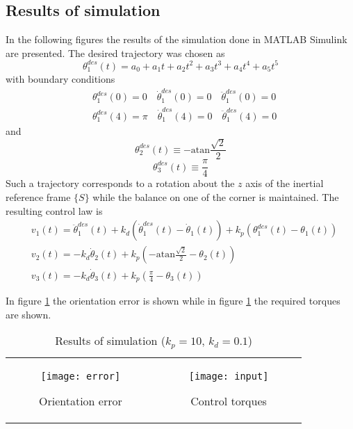\subsection{Results of simulation}
In the following figures the results of the simulation done
in MATLAB Simulink are presented.
The desired trajectory was chosen as
\[
\theta_1^{des}(t) = a_0 + a_1 t + a_2 t^2 + a_3 t^3 + a_4 t^4 + a_5 t^5
\]
with boundary conditions
\[
\begin{split}
  &\theta_1^{des}(0) = 0 \quad \dot{\theta}_1^{des}(0)= 0 \quad \ddot{\theta}_1^{des}(0) = 0\\
    &\theta_1^{des}(4) = \pi \quad \dot{\theta}_1^{des}(4)= 0 \quad \ddot{\theta}_1^{des}(4) = 0
\end{split}
\]
and
\[
\theta_2^{des}(t) \equiv -\mathrm{atan}\frac{\sqrt{2}}{2}
\]
\[
\theta_3^{des}(t) \equiv \frac{\pi}{4}
\]
Such a trajectory corresponds to a rotation about the $z$ axis of the inertial
reference frame $\{S\}$ while the balance on one of the corner is maintained.
The resulting control law is
\begin{equation}\label{eq:PD_yaw}
  \begin{split}
    &v_1(t) = \ddot{\theta}_1^{des}(t) + k_d(\dot{\theta}_1^{des}(t) - \dot{\theta}_1(t)) + k_p (\theta_1^{des}(t) - \theta_1(t))\\
    &v_2(t) = - k_d\dot{\theta}_2(t) + k_p \left(-\mathrm{atan}\frac{\sqrt{2}}{2} - \theta_2(t)\right)\\
    &v_3(t) = - k_d\dot{\theta}_3(t) + k_p \left(\frac{\pi}{4} - \theta_3(t)\right)
  \end{split}
\end{equation}
\par
In figure \ref{fig:orientation_error} the orientation error is shown while
in figure \ref{fig:requested_torques} the required torques are shown.
\begin{table}[h]
  \begin{tabular}{cc}
    \begin{subfigure}{0.5\textwidth}
      \centering
      \texttt{[image: error]}
      \caption{Orientation error \label{fig:orientation_error}}
    \end{subfigure}&
    \begin{subfigure}{0.5\textwidth}
      \centering
      \texttt{[image: input]}
      \caption{Control torques \label{fig:requested_torques}}
    \end{subfigure}
  \end{tabular}
  \caption{Results of simulation ($k_p = 10$, $k_d = 0.1$)}
\end{table}

